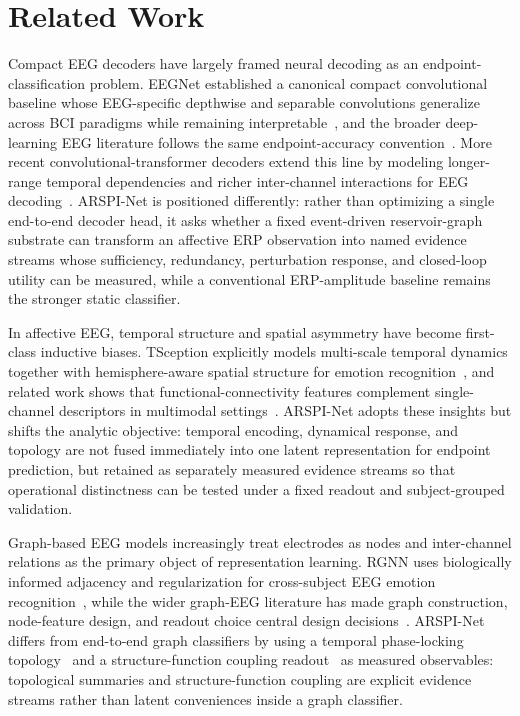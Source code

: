 \documentclass[journal]{IEEEtran}
\begin{document}
\section{Related Work}
Compact EEG decoders have largely framed neural decoding as an endpoint-classification problem. EEGNet established a canonical compact convolutional baseline whose EEG-specific depthwise and separable convolutions generalize across BCI paradigms while remaining interpretable~\cite{lawhern2018eegnet}, and the broader deep-learning EEG literature follows the same endpoint-accuracy convention~\cite{craik2019deep,delpup2025preprocessing}. More recent convolutional-transformer decoders extend this line by modeling longer-range temporal dependencies and richer inter-channel interactions for EEG decoding~\cite{ding2024eegdeformer}. ARSPI-Net is positioned differently: rather than optimizing a single end-to-end decoder head, it asks whether a fixed event-driven reservoir-graph substrate can transform an affective ERP observation into named evidence streams whose sufficiency, redundancy, perturbation response, and closed-loop utility can be measured, while a conventional ERP-amplitude baseline remains the stronger static classifier.

In affective EEG, temporal structure and spatial asymmetry have become first-class inductive biases. TSception explicitly models multi-scale temporal dynamics together with hemisphere-aware spatial structure for emotion recognition~\cite{ding2023tsception}, and related work shows that functional-connectivity features complement single-channel descriptors in multimodal settings~\cite{wu2022connectivity,guo2025mma,chiang2023depression}. ARSPI-Net adopts these insights but shifts the analytic objective: temporal encoding, dynamical response, and topology are not fused immediately into one latent representation for endpoint prediction, but retained as separately measured evidence streams so that operational distinctness can be tested under a fixed readout and subject-grouped validation.

Graph-based EEG models increasingly treat electrodes as nodes and inter-channel relations as the primary object of representation learning. RGNN uses biologically informed adjacency and regularization for cross-subject EEG emotion recognition~\cite{zhong2022rgnn}, while the wider graph-EEG literature has made graph construction, node-feature design, and readout choice central design decisions~\cite{klepl2024gnn,klepl2023ad,kipf2017gcn,velickovic2018gat,battaglia2018relational}. ARSPI-Net differs from end-to-end graph classifiers by using a temporal phase-locking topology~\cite{lachaux1999plv} and a structure-function coupling readout~\cite{honey2009structural,park2013structural,suarez2020linking} as measured observables: topological summaries and structure-function coupling are explicit evidence streams rather than latent conveniences inside a graph classifier.
\end{document}
